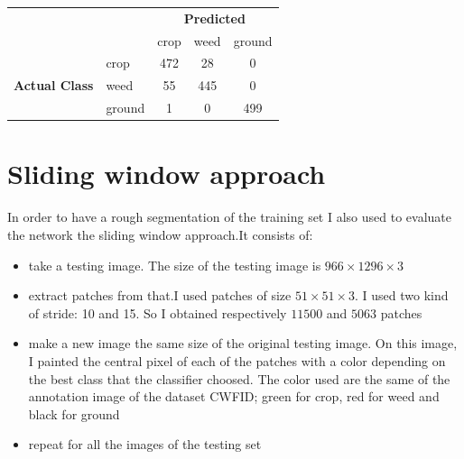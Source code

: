 \documentclass[]{report}
\begin{document}
\begin{table}[h]
\centering

\begin{tabular}{cl|c|c|c|}
\cline{3-5}
\multicolumn{1}{l}{}                                         &        & \multicolumn{3}{c|}{\textbf{Predicted}}                                             \\ \cline{3-5} 
\textbf{}                                                    &        & \multicolumn{1}{l|}{crop} & \multicolumn{1}{l|}{weed} & \multicolumn{1}{l|}{ground} \\ \hline
\multicolumn{1}{|c|}{\multirow{3}{*}{\textbf{Actual Class}}} & crop   & 472                       & 28                        & 0                           \\ \cline{2-5} 
\multicolumn{1}{|c|}{}                                       & weed   & 55                        & 445                       & 0                           \\ \cline{2-5} 
\multicolumn{1}{|c|}{}                                       & ground & 1                         & 0                         & 499                         \\ \hline
\end{tabular}
\end{table} 


\section{Sliding window approach}

In order to have a rough segmentation of the training set I also used to evaluate the network the sliding window approach.It consists of:

\begin{itemize}

	\item take a testing image. The size of the testing image is $ 966\times 1296\times 3$
	\item extract patches from that.I used patches of size $ 51\times 51 \times 3 $. 				  I used two kind of stride: 10 and 15. So I obtained respectively $ 11500 $ and $ 		 		  5063 $ patches
	\item make a new image the same size of the original testing image. On this image, I 					  painted the central pixel of each of the patches with a color depending on the best  		  class that the classifier choosed. The color used are the same of the annotation 		          image of the dataset CWFID; green for crop, red for weed and black for ground
	\item repeat for all the images of the testing set

\end{itemize}
\end{document}
